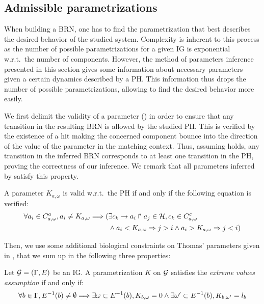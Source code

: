 \subsection{Admissible parametrizations}\label{ssec:admissible-K}

When building a BRN, one has to find the parametrization that best describes the desired behavior of the studied system.
Complexity is inherent to this process as the number of possible parametrizations for a given IG is exponential w.r.t.~the number of components.
However, the method of parameters inference presented in this section gives some information about necessary parameters given a certain dynamics described by a PH.
This information thus drops the number of possible parametrizations, allowing to find the desired behavior more easily.

We first delimit the validity of a parameter () in order to ensure that any
transition in the resulting BRN is allowed by the studied PH.
This is verified by the existence of a hit making the concerned component bounce into the direction
of the value of the parameter in the matching context.
Thus, assuming  holds, any transition in the inferred BRN corresponds to at least
one transition in the PH, proving the correctness of our inference.
%
We remark that all parameters inferred by  satisfy this property.

\begin{property}\label{pro:K-valid}
A parameter $K_{a,\omega}$ is valid w.r.t.~the PH if and only if the following equation is verified:
\begin{align*}
  \forall a_i \in C^a_{a,\omega}, a_i \neq K_{a,\omega} \Longrightarrow
    (& \exists c_k\rightarrow a_i\Rsh a_j\in\mathcal{H}, c_k \in C^c_{a,\omega} \\
     & \wedge a_i < K_{a,\omega} \Rightarrow j > i \wedge  a_i > K_{a,\omega} \Rightarrow j <i )
\end{align*}
\end{property}

Then, we use some additional biological constraints on Thomas' parameters given in
\cite{BernotSemBRN}, that we sum up in the following three properties:

\begin{property}
Let $\mathcal{G} = (\Gamma, E)$ be an IG. A parametrization $K$ on $\mathcal{G}$ satisfies the \emph{extreme values assumption} if and only if:
\label{pro:param_enum_extreme}
\begin{align*}
  \forall b \in \Gamma, E^{-1}(b) \neq \emptyset \Longrightarrow
    \exists \omega \subset E^{-1}(b), K_{b,\omega} = 0 \wedge
    \exists \omega' \subset E^{-1}(b), K_{b,\omega'} = l_b
\end{align*}
\end{property}

